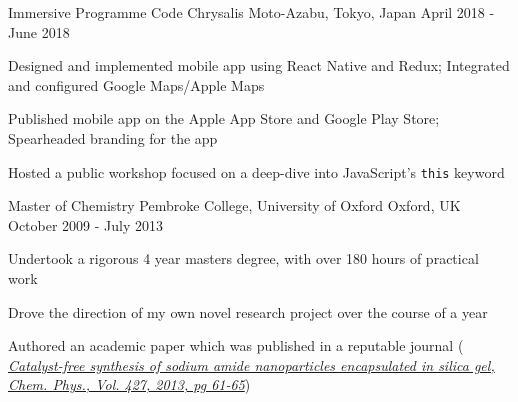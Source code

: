 
\begin{cventries}

  \cventry
  {Immersive Programme} %
  {Code Chrysalis} %
  {Moto-Azabu, Tokyo, Japan} %
  {April 2018 - June 2018} %
  {
    \begin{cvitems} %
      \item {Designed and implemented mobile app using React Native and Redux; Integrated and configured Google Maps/Apple Maps}
      \item {Published mobile app on the Apple App Store and Google Play Store; Spearheaded branding for the app}
      \item {Hosted a public workshop focused on a deep-dive into JavaScript's \texttt{this} keyword}
    \end{cvitems}
  }

  \cventry
  {Master of Chemistry} %
  {Pembroke College, University of Oxford} %
  {Oxford, UK} %
  {October 2009 - July 2013} %
  {
    \begin{cvitems} %
      \item {Undertook a rigorous 4 year masters degree, with over 180 hours of practical work}
      \item {Drove the direction of my own novel research project over the course of a year}
      \item {Authored an academic paper which was published in a reputable journal (\href{https://doi.org/10.1016/j.chemphys.2013.06.003}{\textit{
                      Catalyst-free synthesis of sodium amide nanoparticles encapsulated in silica gel, Chem. Phys., Vol. 427, 2013, pg 61-65}})}
    \end{cvitems}
  }

\end{cventries}

